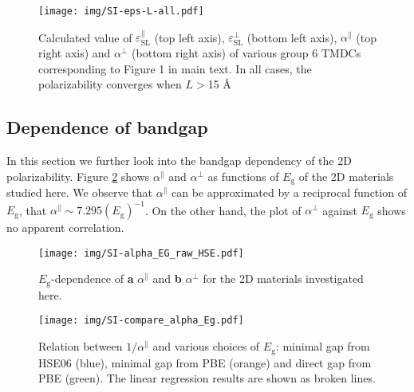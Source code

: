 \documentclass[manuscript=suppinfo,email=true,hyperref=true,keywords=false]{achemso}
\begin{document}
\begin{figure}[htbp]
  \centering
  \texttt{[image: img/SI-eps-L-all.pdf]} 
  \caption{Calculated value of $\varepsilon_{\mathrm{SL}}^{\parallel}$
    (top left axis), $\varepsilon_{\mathrm{SL}}^{\perp}$ (bottom left
    axis), $\alpha^{\parallel}$ (top right axis) and $\alpha^{\perp}$
    (bottom right axis) of various group 6 TMDCs corresponding to
    Figure 1 in main text. In all cases, the polarizability converges
    when $L>$15 \AA{}}
  \label{fig:eps-L-all}
\end{figure}


\subsection{Dependence of bandgap}
\label{sec:pol-2D-2}

In this section we further look into the bandgap dependency of the 2D
polarizability. Figure \ref{fig:SI-raw-HSE} shows $\alpha^{\parallel}$
and $\alpha^{\perp}$ as functions of $E_{\mathrm{g}}$ of the 2D
materials studied here. We observe that $\alpha^{\parallel}$ can be
approximated by a reciprocal function of $E_{\mathrm{g}}$, that
$\alpha^{\parallel}\sim{} 7.295(E_{\mathrm{g}})^{-1}$. On the other
hand, the plot of $\alpha^{\perp}$ against $E_{\mathrm{g}}$ shows no
apparent correlation.
\begin{figure}[htbp]
  \centering
  \texttt{[image: img/SI-alpha\_EG\_raw\_HSE.pdf]}
  \caption{$E_{\mathrm{g}}$-dependence of    \textbf{a} $\alpha^{\parallel}$ and
    \textbf{b} $\alpha^{\perp}$ for the 2D materials investigated here.}
  \label{fig:SI-raw-HSE}
\end{figure}

\begin{figure}[htbp]
  \centering
  \texttt{[image: img/SI-compare\_alpha\_Eg.pdf]}
  \caption{Relation between $1/\alpha^{\parallel}$ and various choices
    of $E_{\mathrm{g}}$: minimal gap from HSE06 (blue), minimal gap
    from PBE (orange) and direct gap from PBE (green). The linear
    regression results are shown as broken lines.}
  \label{fig:alpha-Eg-diff}
\end{figure}
\end{document}
